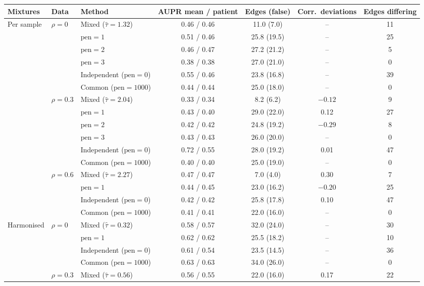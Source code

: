 \documentclass[a4paper, 11pt]{article}
\newcommand{\pen}{\mathrm{pen}}
\theoremstyle{plain}
\theoremstyle{remark}
\begin{document}
\begin{table}[h]
\centering\small
\begin{tabular}{lllcccc}
\toprule
Mixtures & Data & Method & AUPR mean / patient & Edges (false) & Corr.\ deviations & Edges differing \\
\midrule
Per sample & $\rho = 0$ & Mixed ($\hat\tau = 1.32$) & 0.46 / 0.46 & 11.0 (7.0) & -- & 11 \\
 & & $\pen = 1$ & 0.51 / 0.46 & 25.8 (19.5) & -- & 25 \\
 & & $\pen = 2$ & 0.46 / 0.47 & 27.2 (21.2) & -- & 5 \\
 & & $\pen = 3$ & 0.38 / 0.38 & 27.0 (21.0) & -- & 0 \\
 & & Independent ($\pen = 0$) & 0.55 / 0.46 & 23.8 (16.8) & -- & 39 \\
 & & Common ($\pen = 1000$) & 0.44 / 0.44 & 25.0 (18.0) & -- & 0 \\
\cmidrule{2-7}
 & $\rho = 0.3$ & Mixed ($\hat\tau = 2.04$) & 0.33 / 0.34 & 8.2 (6.2) & $-0.12$ & 9 \\
 & & $\pen = 1$ & 0.43 / 0.40 & 29.0 (22.0) & 0.12 & 27 \\
 & & $\pen = 2$ & 0.42 / 0.42 & 24.8 (19.2) & $-0.29$ & 8 \\
 & & $\pen = 3$ & 0.43 / 0.43 & 26.0 (20.0) & -- & 0 \\
 & & Independent ($\pen = 0$) & 0.72 / 0.55 & 28.0 (19.2) & 0.01 & 47 \\
 & & Common ($\pen = 1000$) & 0.40 / 0.40 & 25.0 (19.0) & -- & 0 \\
\cmidrule{2-7}
 & $\rho = 0.6$ & Mixed ($\hat\tau = 2.27$) & 0.47 / 0.47 & 7.0 (4.0) & 0.30 & 7 \\
 & & $\pen = 1$ & 0.44 / 0.45 & 23.0 (16.2) & $-0.20$ & 25 \\
 & & Independent ($\pen = 0$) & 0.42 / 0.42 & 25.8 (17.8) & 0.10 & 47 \\
 & & Common ($\pen = 1000$) & 0.41 / 0.41 & 22.0 (16.0) & -- & 0 \\
\midrule
Harmonised & $\rho = 0$ & Mixed ($\hat\tau = 0.32$) & 0.58 / 0.57 & 32.0 (24.0) & -- & 30 \\
 & & $\pen = 1$ & 0.62 / 0.62 & 25.5 (18.2) & -- & 10 \\
 & & Independent ($\pen = 0$) & 0.61 / 0.54 & 23.5 (14.5) & -- & 36 \\
 & & Common ($\pen = 1000$) & 0.63 / 0.63 & 34.0 (26.0) & -- & 0 \\
\cmidrule{2-7}
 & $\rho = 0.3$ & Mixed ($\hat\tau = 0.56$) & 0.56 / 0.55 & 22.0 (16.0) & 0.17 & 22 \\

\end{tabular}
\end{table}
\end{document}
